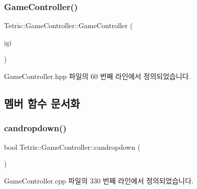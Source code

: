 \subsubsection{\texorpdfstring{Game\+Controller()}{GameController()}\hspace{0.1cm}{\footnotesize\ttfamily [4/4]}}
{\footnotesize\ttfamily Tetris\+::\+Game\+Controller\+::\+Game\+Controller (\begin{DoxyParamCaption}\item[{\hyperlink{class_tetris_1_1_init_game_info}{Init\+Game\+Info} $\ast$}]{igi }\end{DoxyParamCaption})\hspace{0.3cm}{\ttfamily [inline]}}



Game\+Controller.\+hpp 파일의 60 번째 라인에서 정의되었습니다.



\subsection{멤버 함수 문서화}
\mbox{\label{class_tetris_1_1_game_controller_ac4993d5ad8640ac617fec341fdb301ee}} 
\subsubsection{\texorpdfstring{candropdown()}{candropdown()}\hspace{0.1cm}{\footnotesize\ttfamily [1/2]}}
{\footnotesize\ttfamily bool Tetris\+::\+Game\+Controller\+::candropdown (\begin{DoxyParamCaption}{ }\end{DoxyParamCaption})}



Game\+Controller.\+cpp 파일의 330 번째 라인에서 정의되었습니다.

